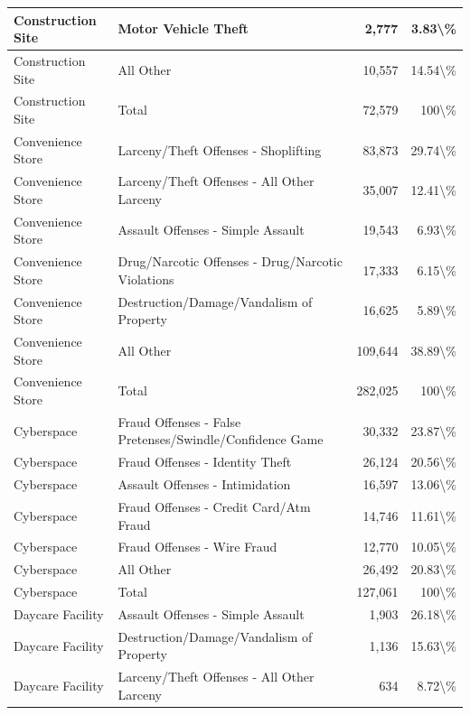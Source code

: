 \documentclass[
]{krantz}
\begin{document}
\begin{longtable}[t]{l|l|r|r}
\hline
Construction Site & Motor Vehicle Theft & 2,777 & 3.83\textbackslash{}\%\\
\hline
Construction Site & All Other & 10,557 & 14.54\textbackslash{}\%\\
\hline
Construction Site & Total & 72,579 & 100\textbackslash{}\%\\
\hline
Convenience Store & Larceny/Theft Offenses - Shoplifting & 83,873 & 29.74\textbackslash{}\%\\
\hline
Convenience Store & Larceny/Theft Offenses - All Other Larceny & 35,007 & 12.41\textbackslash{}\%\\
\hline
Convenience Store & Assault Offenses - Simple Assault & 19,543 & 6.93\textbackslash{}\%\\
\hline
Convenience Store & Drug/Narcotic Offenses - Drug/Narcotic Violations & 17,333 & 6.15\textbackslash{}\%\\
\hline
Convenience Store & Destruction/Damage/Vandalism of Property & 16,625 & 5.89\textbackslash{}\%\\
\hline
Convenience Store & All Other & 109,644 & 38.89\textbackslash{}\%\\
\hline
Convenience Store & Total & 282,025 & 100\textbackslash{}\%\\
\hline
Cyberspace & Fraud Offenses - False Pretenses/Swindle/Confidence Game & 30,332 & 23.87\textbackslash{}\%\\
\hline
Cyberspace & Fraud Offenses - Identity Theft & 26,124 & 20.56\textbackslash{}\%\\
\hline
Cyberspace & Assault Offenses - Intimidation & 16,597 & 13.06\textbackslash{}\%\\
\hline
Cyberspace & Fraud Offenses - Credit Card/Atm Fraud & 14,746 & 11.61\textbackslash{}\%\\
\hline
Cyberspace & Fraud Offenses - Wire Fraud & 12,770 & 10.05\textbackslash{}\%\\
\hline
Cyberspace & All Other & 26,492 & 20.83\textbackslash{}\%\\
\hline
Cyberspace & Total & 127,061 & 100\textbackslash{}\%\\
\hline
Daycare Facility & Assault Offenses - Simple Assault & 1,903 & 26.18\textbackslash{}\%\\
\hline
Daycare Facility & Destruction/Damage/Vandalism of Property & 1,136 & 15.63\textbackslash{}\%\\
\hline
Daycare Facility & Larceny/Theft Offenses - All Other Larceny & 634 & 8.72\textbackslash{}\%\\
\hline

\end{longtable}
\end{document}
